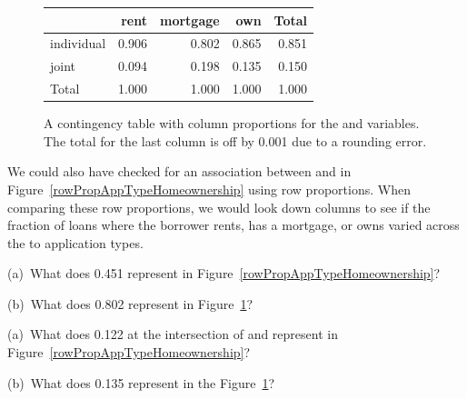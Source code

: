 \begin{figure}[h]
\centering%
\begin{tabular}{l rrr r}
  \hline
  & rent & mortgage & own & Total \\
  \hline
  individual &
      0.906 &
      0.802 &
      0.865 &
      0.851 \\
  joint &
      0.094 &
      0.198 &
      0.135 &
      0.150 \\
  \hline
  Total & 1.000 & 1.000 & 1.000 & 1.000 \\
  \hline
\end{tabular}
\caption{A contingency table with column proportions for the
     and 
    variables.
    The total for the last column is off by 0.001 due
    to a rounding error.}
\label{colPropAppTypeHomeownership}
\end{figure}

We could also have checked for an association between  and  in Figure~\ref{rowPropAppTypeHomeownership} using row proportions. When comparing these row proportions, we would look down columns to see if the fraction of loans where the borrower rents, has a mortgage, or owns varied across the  to  application types.

\begin{exercisewrap}
\begin{nexercise}
(a)~What does 0.451 represent in
Figure~\ref{rowPropAppTypeHomeownership}?

(b)~What does 0.802 represent in
Figure~\ref{colPropAppTypeHomeownership}?\footnotemark{}
\end{nexercise}
\end{exercisewrap}

\begin{exercisewrap}
\begin{nexercise}
(a)~What does 0.122 at the intersection of  and
 represent in
Figure~\ref{rowPropAppTypeHomeownership}?

(b)~What does 0.135 represent in the
Figure~\ref{colPropAppTypeHomeownership}?\footnotemark{}
\end{nexercise}
\end{exercisewrap}


